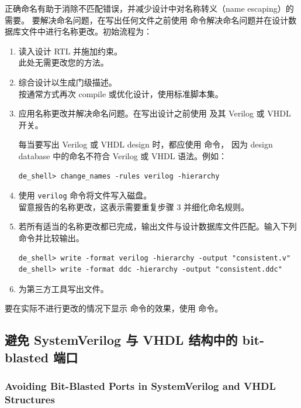正确命名有助于消除不匹配错误，并减少设计中对名称转义（name escaping）的需要。
要解决命名问题，在写出任何文件之前使用  命令解决命名问题并在设计数据库文件中进行名称更改。初始流程为：
\begin{enumerate}
  \item 读入设计 RTL 并施加约束。\\
        此处无需更改您的方法。
  \item 综合设计以生成门级描述。\\
        按通常方式再次 compile 或优化设计，使用标准脚本集。
  \item 应用名称更改并解决命名问题。在写出设计之前使用  及其 Verilog 或 VHDL 开关。

\begin{noteBox}
每当要写出 Verilog 或 VHDL design 时，都应使用
    命令，
因为 design database 中的命名不符合 Verilog 或 VHDL 语法。例如：
\begin{lstlisting}
de_shell> change_names -rules verilog -hierarchy
\end{lstlisting}
\end{noteBox}
  \item 使用   \texttt{verilog} 命令将文件写入磁盘。\\
        留意报告的名称更改，这表示需要重复步骤 3 并细化命名规则。
  \item 若所有适当的名称更改都已完成，输出文件与设计数据库文件匹配。输入下列命令并比较输出。
\begin{lstlisting}
de_shell> write -format verilog -hierarchy -output "consistent.v"
de_shell> write -format ddc -hierarchy -output "consistent.ddc"
\end{lstlisting}
  \item 为第三方工具写出文件。
\end{enumerate}

要在实际不进行更改的情况下显示  命令的效果，使用  命令。

\subsection{避免 SystemVerilog 与 VHDL 结构中的 bit-blasted 端口}
\subsubsection*{Avoiding Bit-Blasted Ports in SystemVerilog and VHDL Structures}


